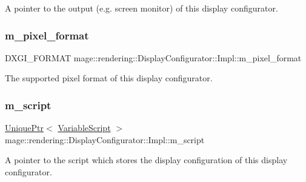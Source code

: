 A pointer to the output (e.\+g. screen monitor) of this display configurator. \hypertarget{classmage_1_1rendering_1_1_display_configurator_1_1_impl_a87d52e7bc1a1e4fe9786b3b0ec3fc1e1}{}\label{classmage_1_1rendering_1_1_display_configurator_1_1_impl_a87d52e7bc1a1e4fe9786b3b0ec3fc1e1} 
\subsubsection{\texorpdfstring{m\+\_\+pixel\+\_\+format}{m\_pixel\_format}}
{\footnotesize\ttfamily D\+X\+G\+I\+\_\+\+F\+O\+R\+M\+AT mage\+::rendering\+::\+Display\+Configurator\+::\+Impl\+::m\+\_\+pixel\+\_\+format\hspace{0.3cm}{\ttfamily [private]}}

The supported pixel format of this display configurator. \hypertarget{classmage_1_1rendering_1_1_display_configurator_1_1_impl_aa11b99f1bdf03e3d1eee4d4907479c45}{}\label{classmage_1_1rendering_1_1_display_configurator_1_1_impl_aa11b99f1bdf03e3d1eee4d4907479c45} 
\subsubsection{\texorpdfstring{m\+\_\+script}{m\_script}}
{\footnotesize\ttfamily \hyperlink{namespacemage_a3316d7143a973e37adf1110f2e80ca31}{Unique\+Ptr}$<$ \hyperlink{classmage_1_1_variable_script}{Variable\+Script} $>$ mage\+::rendering\+::\+Display\+Configurator\+::\+Impl\+::m\+\_\+script\hspace{0.3cm}{\ttfamily [private]}}

A pointer to the script which stores the display configuration of this display configurator. \hypertarget{classmage_1_1rendering_1_1_display_configurator_1_1_impl_a2ead8221b0659d05699de6ef4d3c0ba4}{}\label{classmage_1_1rendering_1_1_display_configurator_1_1_impl_a2ead8221b0659d05699de6ef4d3c0ba4} 
